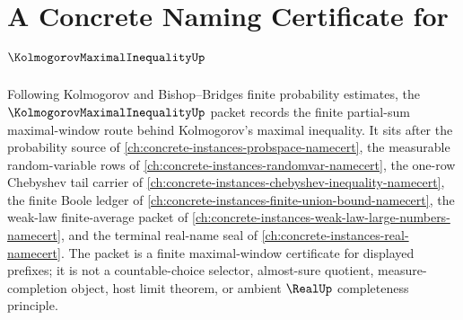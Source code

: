 \chapter{A Concrete Naming Certificate for $\KolmogorovMaximalInequalityUp$}
\label{ch:concrete-instances-kolmogorov-maximal-inequality-namecert}

Following Kolmogorov and Bishop--Bridges finite probability estimates, the $\KolmogorovMaximalInequalityUp$ packet records the finite partial-sum maximal-window route behind Kolmogorov's maximal inequality. It sits after the probability source of \autoref{ch:concrete-instances-probspace-namecert}, the measurable random-variable rows of \autoref{ch:concrete-instances-randomvar-namecert}, the one-row Chebyshev tail carrier of \autoref{ch:concrete-instances-chebyshev-inequality-namecert}, the finite Boole ledger of \autoref{ch:concrete-instances-finite-union-bound-namecert}, the weak-law finite-average packet of \autoref{ch:concrete-instances-weak-law-large-numbers-namecert}, and the terminal real-name seal of \autoref{ch:concrete-instances-real-namecert}. The packet is a finite maximal-window certificate for displayed prefixes; it is not a countable-choice selector, almost-sure quotient, measure-completion object, host limit theorem, or ambient $\RealUp$ completeness principle.

